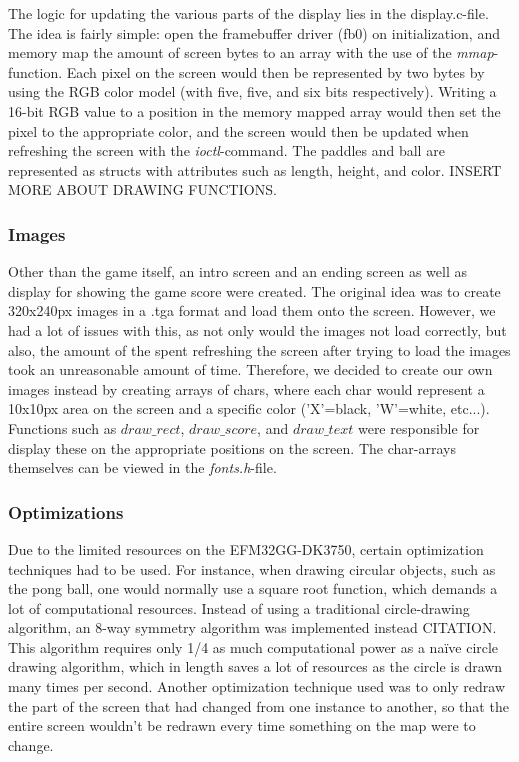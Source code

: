 The logic for updating the various parts of the display lies in the display.c-file. The idea is fairly simple: open the framebuffer driver (fb0) on initialization, and memory map the amount of screen bytes to an array with the use of the \emph{mmap}-function. Each pixel on the screen would then be represented by two bytes by using the RGB color model (with five, five, and six bits respectively). Writing a 16-bit RGB value to a position in the memory mapped array would then set the pixel to the appropriate color, and the screen would then be updated when refreshing the screen with the \emph{ioctl}-command. The paddles and ball are represented as structs with attributes such as length, height, and color. INSERT MORE ABOUT DRAWING FUNCTIONS.

\subsubsection{Images}

Other than the game itself, an intro screen and an ending screen as well as display for showing the game score were created. The original idea was to create 320x240px images in a .tga format and load them onto the screen. However, we had a lot of issues with this, as not only would the images not load correctly, but also, the amount of the spent refreshing the screen after trying to load the images took an unreasonable amount of time. Therefore, we decided to create our own images instead by creating arrays of chars, where each char would represent a 10x10px area on the screen and a specific color ('X'=black, 'W'=white, etc...). Functions such as \emph{$draw\_rect$}, \emph{$draw\_score$}, and \emph{$draw\_text$} were responsible for display these on the appropriate positions on the screen. The char-arrays themselves can be viewed in the \emph{fonts.h}-file.


\subsubsection{Optimizations}

Due to the limited resources on the EFM32GG-DK3750, certain optimization techniques had to be used. For instance, when drawing circular objects, such as the pong ball, one would normally use a square root function, which demands a lot of computational resources. Instead of using a traditional circle-drawing algorithm, an 8-way symmetry algorithm was implemented instead CITATION. This algorithm requires only 1/4 as much computational power as a naïve circle drawing algorithm, which in length saves a lot of resources as the circle is drawn many times per second.
	Another optimization technique used was to only redraw the part of the screen that had changed from one instance to another, so that the entire screen wouldn't be redrawn every time something on the map were to change.  

